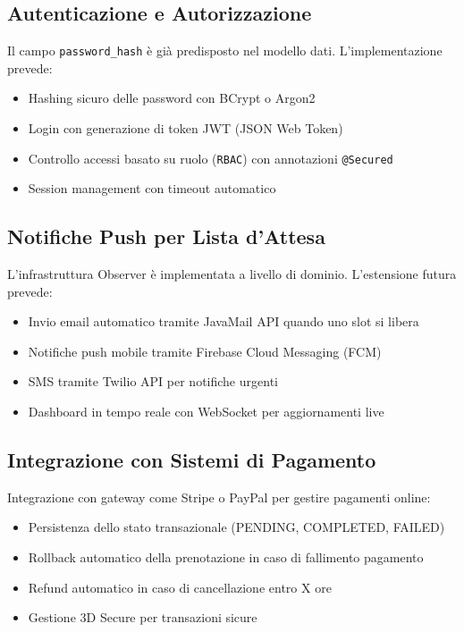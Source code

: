 \subsection{Autenticazione e Autorizzazione}
Il campo \texttt{password\_hash} è già predisposto nel modello dati. L'implementazione prevede:
\begin{itemize}
    \item Hashing sicuro delle password con BCrypt o Argon2
    \item Login con generazione di token JWT (JSON Web Token)
    \item Controllo accessi basato su ruolo (\texttt{RBAC}) con annotazioni \texttt{@Secured}
    \item Session management con timeout automatico
\end{itemize}

\subsection{Notifiche Push per Lista d'Attesa}
L'infrastruttura Observer è implementata a livello di dominio. L'estensione futura prevede:
\begin{itemize}
    \item Invio email automatico tramite JavaMail API quando uno slot si libera
    \item Notifiche push mobile tramite Firebase Cloud Messaging (FCM)
    \item SMS tramite Twilio API per notifiche urgenti
    \item Dashboard in tempo reale con WebSocket per aggiornamenti live
\end{itemize}

\subsection{Integrazione con Sistemi di Pagamento}
Integrazione con gateway come Stripe o PayPal per gestire pagamenti online:
\begin{itemize}
    \item Persistenza dello stato transazionale (PENDING, COMPLETED, FAILED)
    \item Rollback automatico della prenotazione in caso di fallimento pagamento
    \item Refund automatico in caso di cancellazione entro X ore
    \item Gestione 3D Secure per transazioni sicure
\end{itemize}


